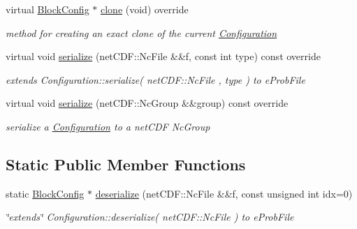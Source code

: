 \begin{DoxyCompactItemize}
virtual \mbox{\hyperlink{class_s_m_spp__di__unipi__it_1_1_block_config}{Block\+Config}} $\ast$ \mbox{\hyperlink{class_s_m_spp__di__unipi__it_1_1_block_config_aad48f22d1d55c91173132511df58c35b}{clone}} (void) override
\begin{DoxyCompactList}\small\item\em method for creating an exact clone of the current \mbox{\hyperlink{class_s_m_spp__di__unipi__it_1_1_configuration}{Configuration}} \end{DoxyCompactList}\item 
virtual void \mbox{\hyperlink{class_s_m_spp__di__unipi__it_1_1_block_config_a978c6b5919ce07663f3c325a99013bac}{serialize}} (net\+C\+D\+F\+::\+Nc\+File \&\&f, const int type) const override
\begin{DoxyCompactList}\small\item\em extends Configuration\+::serialize( net\+C\+D\+F\+::\+Nc\+File , type ) to e\+Prob\+File \end{DoxyCompactList}\item 
virtual void \mbox{\hyperlink{class_s_m_spp__di__unipi__it_1_1_block_config_a8a626d908100f4419905d89f771150aa}{serialize}} (net\+C\+D\+F\+::\+Nc\+Group \&\&group) const override
\begin{DoxyCompactList}\small\item\em serialize a \mbox{\hyperlink{class_s_m_spp__di__unipi__it_1_1_configuration}{Configuration}} to a net\+C\+DF Nc\+Group \end{DoxyCompactList}\end{DoxyCompactItemize}
\subsection*{Static Public Member Functions}
\begin{DoxyCompactItemize}
\item 
static \mbox{\hyperlink{class_s_m_spp__di__unipi__it_1_1_block_config}{Block\+Config}} $\ast$ \mbox{\hyperlink{class_s_m_spp__di__unipi__it_1_1_block_config_a9fd3061a0f53bf1121551e9fffd4b202}{deserialize}} (net\+C\+D\+F\+::\+Nc\+File \&\&f, const unsigned int idx=0)
\begin{DoxyCompactList}\small\item\em \char`\"{}extends\char`\"{} Configuration\+::deserialize( net\+C\+D\+F\+::\+Nc\+File ) to e\+Prob\+File \end{DoxyCompactList}\end{DoxyCompactItemize}
